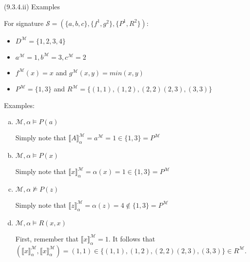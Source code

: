 \begin{frame}{(9.3.4.ii) Examples}

For signature $\mathcal{S}=(\{a,b,c\}, \{f^1, g^2\}, \{P^1, R^2\})$:
							
						
						\begin{itemize}
						
							\item $D^\mathcal{M}=\{1,2,3,4\}$
							
							\item $a^\mathcal{M}=1, b^\mathcal{M}=3, c^\mathcal{M}=2$
						
							\item $f^\mathcal{M}(x)=x$ and $g^\mathcal{M}(x,y)=min(x,y)$
							
							\item $P^\mathcal{M}=\{1,3\}$ and $R^\mathcal{M}=\{(1,1), (1,2),(2,2) (2,3), (3,3)\}$
						
						\end{itemize}
						
	Examples:
	\begin{enumerate}[(a)]
			
			\item $\mathcal{M},\alpha\vDash P(a)$
				
				Simply note that $\llbracket A\rrbracket^\mathcal{M}_\alpha=a^\mathcal{M}=1\in \{1,3\}=P^\mathcal{M}$		
					
				\item $\mathcal{M},\alpha\vDash P(x)$
				
				Simply note that $\llbracket x\rrbracket^\mathcal{M}_\alpha=\alpha(x)=1\in \{1,3\}=P^\mathcal{M}$
				
				\item $\mathcal{M},\alpha\nvDash P(z)$
				
				Simply note that $\llbracket z\rrbracket^\mathcal{M}_\alpha=\alpha(z)=4\notin \{1,3\}=P^\mathcal{M}$
				
				\item $\mathcal{M},\alpha\vDash R(x,x)$
				
				First,  remember that $\llbracket x\rrbracket^\mathcal{M}_\alpha=1.$ It follows that $(\llbracket x\rrbracket^\mathcal{M}_\alpha,\llbracket x\rrbracket^\mathcal{M}_\alpha)=(1,1)\in\{(1,1), (1,2),(2,2) (2,3), (3,3)\}\in R^\mathcal{M}$.
				
	\end{enumerate}
						

\end{frame}


